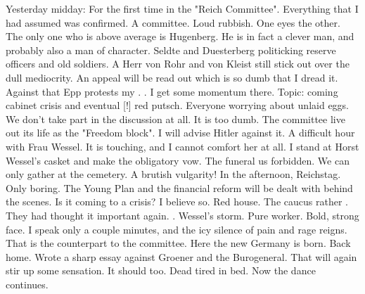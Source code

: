 Yesterday midday: For the first time in the "Reich Committee". Everything that I had assumed was confirmed. A committee. Loud rubbish. One eyes the other. The only one who is above average is Hugenberg. He is in fact a clever man, and probably also a man of character. Seldte and Duesterberg politicking reserve officers and old soldiers. A Herr von Rohr and von Kleist still stick out over the dull mediocrity. An appeal will be read out which is so dumb that I dread it. Against that Epp protests my . . I get some momentum there. Topic: coming cabinet crisis and eventual [!] red putsch. Everyone worrying about unlaid eggs. We don't take part in the discussion at all. It is too dumb. The committee live out its life as the "Freedom block". I will advise Hitler against it. A difficult hour with Frau Wessel. It is touching, and I cannot comfort her at all. I stand at Horst Wessel's casket and make the obligatory vow. The funeral us forbidden. We can only gather at the cemetery. A brutish vulgarity! In the afternoon, Reichstag. Only boring. The Young Plan and the financial reform will be dealt with behind the scenes. Is it coming to a crisis? I believe so. Red house. The caucus rather . They had thought it important again. . Wessel's storm. Pure worker. Bold, strong face. I speak only a couple minutes, and the icy silence of pain and rage reigns. That is the counterpart to the committee. Here the new Germany is born. Back home. Wrote a sharp essay against Groener and the Burogeneral. That will again stir up some sensation. It should too. Dead tired in bed. Now the dance continues.

